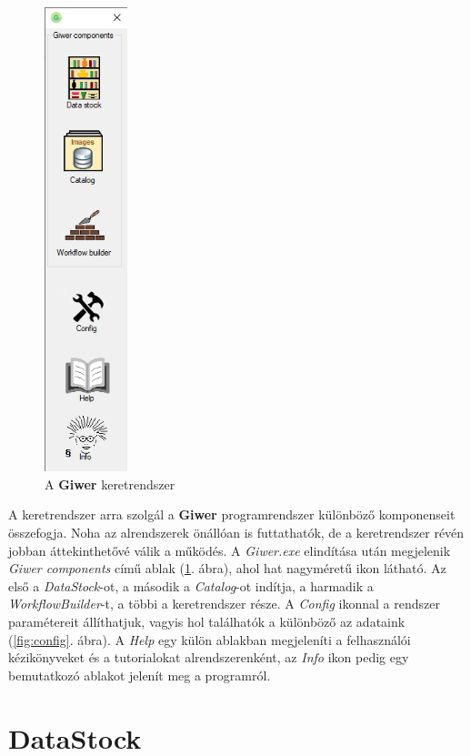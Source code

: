 \documentclass[a4paper,12pt]{book}
\begin{document}
\begin{figure}[h]
	\centering
	\includegraphics[height=13.5cm]{giwerMain.png}
	\caption{A \textbf{Giwer} keretrendszer}
	\label{fig:giwerStart}
\end{figure}

A keretrendszer arra szolgál a \textbf{Giwer} programrendszer különböző komponenseit összefogja. Noha az alrendszerek önállóan is futtathatók, de a keretrendszer révén jobban áttekinthetővé válik a működés. A \textit{Giwer.exe} elindítása után megjelenik \textit{Giwer components} című ablak (\ref{fig:giwerStart}. ábra), ahol hat nagyméretű ikon látható. Az első a \textit{DataStock}-ot, a második a \textit{Catalog}-ot indítja, a harmadik a  \textit{WorkflowBuilder}-t, a többi a keretrendszer része. A \textit{Config} ikonnal a rendszer paramétereit állíthatjuk, vagyis hol találhatók a különböző az adataink (\ref{fig:config}. ábra). A \textit{Help} egy külön ablakban megjeleníti a felhasználói kézikönyveket és a tutorialokat alrendszerenként, az \textit{Info} ikon pedig egy bemutatkozó ablakot jelenít meg a programról.




\chapter{DataStock}
\end{document}
